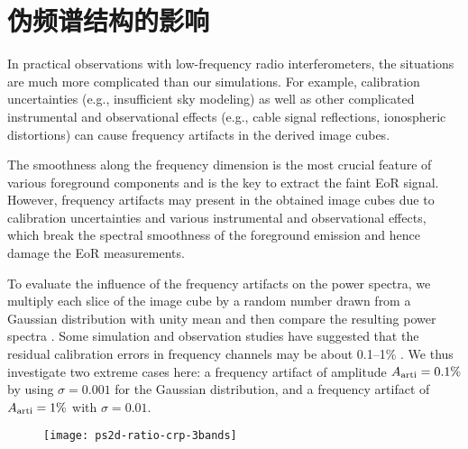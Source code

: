 \section{伪频谱结构的影响}
\label{sec:freq-artifacts}

In practical observations with low-frequency radio interferometers, the
situations are much more complicated than our simulations.
For example, calibration uncertainties (e.g., insufficient sky modeling)
as well as other complicated instrumental and observational effects
(e.g., cable signal reflections, ionospheric distortions) can cause
frequency artifacts in the derived image cubes.

The smoothness along the frequency dimension is the most crucial feature
of various foreground components and is the key to extract the faint EoR
signal.
However, frequency artifacts may present in the obtained image cubes due
to calibration uncertainties and various instrumental and observational
effects, which break the spectral smoothness of the foreground emission
and hence damage the EoR measurements.

To evaluate the influence of the frequency artifacts on the power
spectra, we multiply each slice of the image cube by a random number
drawn from a Gaussian distribution with unity mean and then compare
the resulting power spectra \cite{chapman2016}.
Some simulation and observation studies have suggested that the residual
calibration errors in frequency channels may be about \numrange{0.1}{1}\%
\cite{barry2016,beardsley2016,ewallWice2017}.
We thus investigate two extreme cases here:
a frequency artifact of amplitude $A_{\mathrm{arti}} = 0.1\%$ by
using $\sigma = 0.001$ for the Gaussian distribution,
and a frequency artifact of $A_{\mathrm{arti}} = 1\%$ with $\sigma = 0.01$.

\begin{figure}[htp]
  \centering
  \texttt{[image: ps2d-ratio-crp-3bands]}
  \label{fig:ps2d-ratio-crp}
\end{figure}

